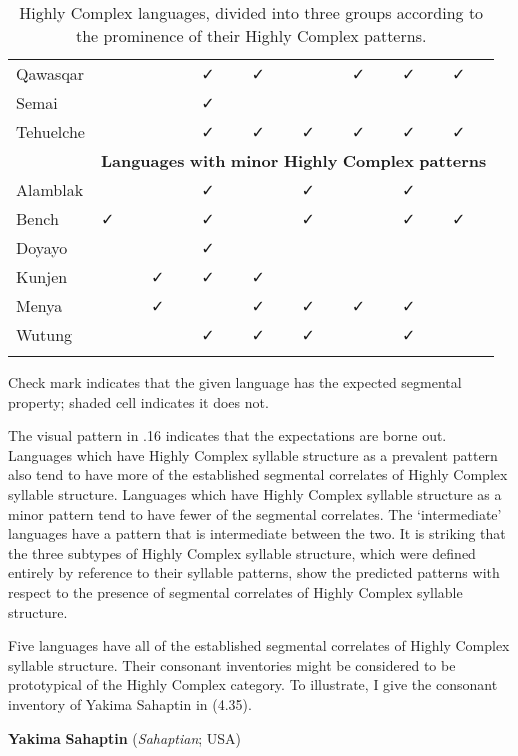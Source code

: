 \begin{table}
\begin{tabularx}{\textwidth}{XXXXXXXXX}
\hhline{~--------}
 Qawasqar &  &  & ✓ & ✓ &  & ✓ & ✓ & ✓\\
\hhline{~--------}
 Semai &  &  & ✓ &  &  &  &  & \\
\hhline{~--------}
 Tehuelche &  &  & ✓ & ✓ & ✓ & ✓ & ✓ & ✓\\
& \multicolumn{8}{c}{ \textbf{Languages} \textbf{with} \textbf{minor} \textbf{Highly} \textbf{Complex} \textbf{patterns}}\\
\hhline{~--------}
 Alamblak &  &  & ✓ &  & ✓ &  & ✓ & \\
\hhline{~--------}
 Bench & ✓ &  & ✓ &  & ✓ &  & ✓ & ✓\\
\hhline{~--------}
 Doyayo &  &  & ✓ &  &  &  &  & \\
\hhline{~--------}
 Kunjen &  & ✓ & ✓ & ✓ &  &  &  & \\
\hhline{~--------}
 Menya &  & ✓ &  & ✓ & ✓ & ✓ & ✓ & \\
\hhline{~--------}
 Wutung &  &  & ✓ & ✓ & ✓ &  & ✓ & \\
\lspbottomrule
\end{tabularx}
\caption{\label{4.16}Highly Complex languages, divided into three groups according to the prominence of their Highly Complex patterns.}Check mark indicates that the given language has the expected segmental property; shaded cell indicates it does not.
\end{table}

  The visual pattern in .16 indicates that the expectations are borne out. Languages which have Highly Complex syllable structure as a prevalent pattern also tend to have more of the established segmental correlates of Highly Complex syllable structure. Languages which have Highly Complex syllable structure as a minor pattern tend to have fewer of the segmental correlates. The ‘intermediate’ languages have a pattern that is intermediate between the two. It is striking that the three subtypes of Highly Complex syllable structure, which were defined entirely by reference to their syllable patterns, show the predicted patterns with respect to the presence of segmental correlates of Highly Complex syllable structure.

  Five languages have all of the established segmental correlates of Highly Complex syllable structure. Their consonant inventories might be considered to be prototypical of the Highly Complex category. To illustrate, I give the consonant inventory of Yakima Sahaptin in (4.35).

\ea\label{ex:(4.35)}
   \textbf{Yakima} \textbf{Sahaptin} (\textit{Sahaptian}; USA)

